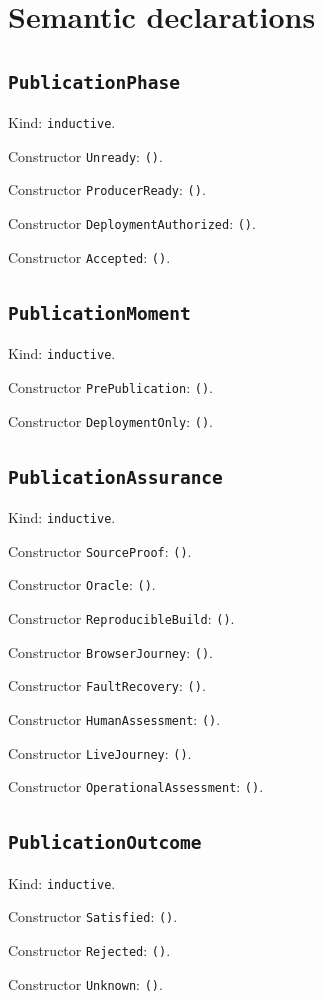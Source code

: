 \documentclass[11pt]{article}
\begin{document}
\section*{Semantic declarations}
\subsection*{\texttt{PublicationPhase}}
\noindent Kind: \texttt{inductive}.\par
\noindent Constructor \texttt{Unready}: \texttt{()}.\par
\noindent Constructor \texttt{ProducerReady}: \texttt{()}.\par
\noindent Constructor \texttt{DeploymentAuthorized}: \texttt{()}.\par
\noindent Constructor \texttt{Accepted}: \texttt{()}.\par
\subsection*{\texttt{PublicationMoment}}
\noindent Kind: \texttt{inductive}.\par
\noindent Constructor \texttt{PrePublication}: \texttt{()}.\par
\noindent Constructor \texttt{DeploymentOnly}: \texttt{()}.\par
\subsection*{\texttt{PublicationAssurance}}
\noindent Kind: \texttt{inductive}.\par
\noindent Constructor \texttt{SourceProof}: \texttt{()}.\par
\noindent Constructor \texttt{Oracle}: \texttt{()}.\par
\noindent Constructor \texttt{ReproducibleBuild}: \texttt{()}.\par
\noindent Constructor \texttt{BrowserJourney}: \texttt{()}.\par
\noindent Constructor \texttt{FaultRecovery}: \texttt{()}.\par
\noindent Constructor \texttt{HumanAssessment}: \texttt{()}.\par
\noindent Constructor \texttt{LiveJourney}: \texttt{()}.\par
\noindent Constructor \texttt{OperationalAssessment}: \texttt{()}.\par
\subsection*{\texttt{PublicationOutcome}}
\noindent Kind: \texttt{inductive}.\par
\noindent Constructor \texttt{Satisfied}: \texttt{()}.\par
\noindent Constructor \texttt{Rejected}: \texttt{()}.\par
\noindent Constructor \texttt{Unknown}: \texttt{()}.\par
\end{document}
